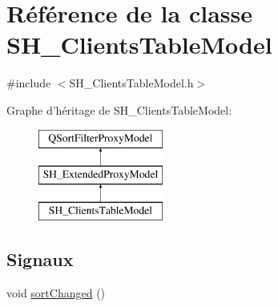 \hypertarget{classSH__ClientsTableModel}{\section{Référence de la classe S\-H\-\_\-\-Clients\-Table\-Model}
\label{classSH__ClientsTableModel}
}


{\ttfamily \#include $<$S\-H\-\_\-\-Clients\-Table\-Model.\-h$>$}

Graphe d'héritage de S\-H\-\_\-\-Clients\-Table\-Model\-:\begin{figure}[H]
\begin{center}
\leavevmode
\includegraphics[height=3.000000cm]{classSH__ClientsTableModel}
\end{center}
\end{figure}
\subsection*{Signaux}
\begin{DoxyCompactItemize}
\item 
void \hyperlink{classSH__ExtendedProxyModel_ad34f69425d6c86a2671cf9f85562a724}{sort\-Changed} ()
\end{DoxyCompactItemize}
